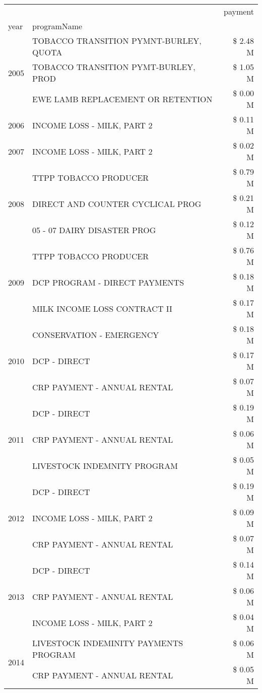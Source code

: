 \begin{tabular}{llr}
\toprule
 &  & payment \\
year & programName &  \\
\midrule
\multirow[t]{3}{*}{2005} & TOBACCO TRANSITION PYMNT-BURLEY, QUOTA & \$ 2.48 M \\
 & TOBACCO TRANSITION PYMT-BURLEY, PROD & \$ 1.05 M \\
 & EWE LAMB REPLACEMENT OR RETENTION & \$ 0.00 M \\
\cline{1-3}
2006 & INCOME LOSS - MILK, PART 2 & \$ 0.11 M \\
\cline{1-3}
2007 & INCOME LOSS - MILK, PART 2 & \$ 0.02 M \\
\cline{1-3}
\multirow[t]{3}{*}{2008} & TTPP TOBACCO PRODUCER & \$ 0.79 M \\
 & DIRECT AND COUNTER CYCLICAL PROG & \$ 0.21 M \\
 & 05 - 07 DAIRY DISASTER PROG & \$ 0.12 M \\
\cline{1-3}
\multirow[t]{3}{*}{2009} & TTPP TOBACCO PRODUCER & \$ 0.76 M \\
 & DCP PROGRAM - DIRECT PAYMENTS & \$ 0.18 M \\
 & MILK INCOME LOSS CONTRACT II & \$ 0.17 M \\
\cline{1-3}
\multirow[t]{3}{*}{2010} & CONSERVATION - EMERGENCY & \$ 0.18 M \\
 & DCP - DIRECT & \$ 0.17 M \\
 & CRP PAYMENT - ANNUAL RENTAL & \$ 0.07 M \\
\cline{1-3}
\multirow[t]{3}{*}{2011} & DCP - DIRECT & \$ 0.19 M \\
 & CRP PAYMENT - ANNUAL RENTAL & \$ 0.06 M \\
 & LIVESTOCK INDEMNITY PROGRAM & \$ 0.05 M \\
\cline{1-3}
\multirow[t]{3}{*}{2012} & DCP - DIRECT & \$ 0.19 M \\
 & INCOME LOSS - MILK, PART 2 & \$ 0.09 M \\
 & CRP PAYMENT - ANNUAL RENTAL & \$ 0.07 M \\
\cline{1-3}
\multirow[t]{3}{*}{2013} & DCP - DIRECT & \$ 0.14 M \\
 & CRP PAYMENT - ANNUAL RENTAL & \$ 0.06 M \\
 & INCOME LOSS - MILK, PART 2 & \$ 0.04 M \\
\cline{1-3}
\multirow[t]{3}{*}{2014} & LIVESTOCK INDEMINITY PAYMENTS PROGRAM & \$ 0.06 M \\
 & CRP PAYMENT - ANNUAL RENTAL & \$ 0.05 M \\

\end{tabular}
